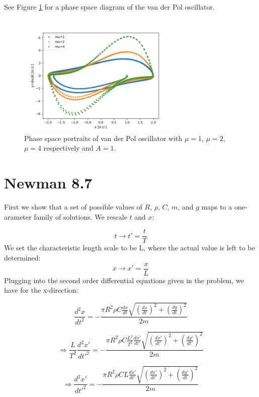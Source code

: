 \documentclass[11pt]{article}
\begin{document}
See Figure \ref{Pol} for a phase space diagram of the van der Pol oscillator. 
\begin{figure}[!htbp]
    \centering
    \includegraphics[width=0.7\textwidth]{Pol.png}
    \caption{Phase space portraits of van der Pol oscillator with $\mu=1$, $\mu=2$, $\mu=4$ respectively and $A=1$.}
    \label{Pol}
\end{figure}

\section{Newman 8.7}
First we show that a set of possible values of $R$, $\rho$, $C$, $m$, and $g$ maps to a one-arameter family of solutions. We rescale $t$ and $x$:

\begin{equation}
    t\rightarrow t'= \frac{t}{T}
\end{equation}
We set the characteristic length scale to be L, where the actual value is left to be determined:
\begin{equation}
    x \rightarrow x'=\frac{x}{L}
\end{equation}
Plugging into the second order differential equations given in the problem, we have for the x-direction:

\begin{equation}
    \frac{d^2x}{dt^2}=-\frac{\pi R^2 \rho C \frac{dx}{dt}\sqrt{(\frac{dx}{dt})^2+(\frac{dy}{dt})^2}}{2m}
\end{equation}

\begin{equation}
    \Rightarrow \frac{L}{T^2}\frac{d^2x'}{dt'^2}=-\frac{\pi R^2 \rho C \frac{L^2}{T^2}\frac{dx'}{dt'}\sqrt{(\frac{dx'}{dt'})^2+(\frac{dy'}{dt'})^2}}{2m}
\end{equation}

\begin{equation}
    \Rightarrow \frac{d^2x'}{dt'^2}=-\frac{\pi R^2 \rho C L\frac{dx'}{dt'}\sqrt{(\frac{dx'}{dt'})^2+(\frac{dy'}{dt})^2}}{2m}
\end{equation}
\end{document}
